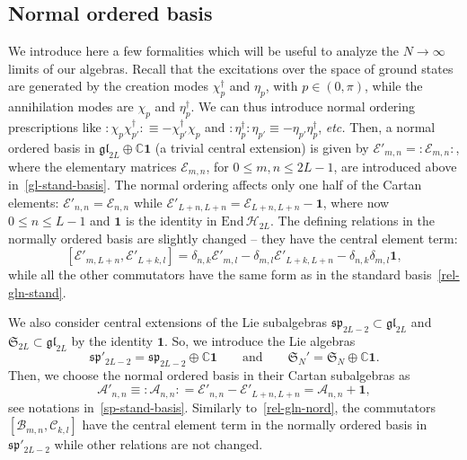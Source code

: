 \documentclass[11pt]{article}
\newcommand{\one}{\boldsymbol{1}}%
\newcommand{\Hilb}{\mathcal{H}}
\newcommand{\oC}{\mathbb{C}}
\newcommand{\Endo}{\mathrm{End}}
\newcommand{\interLie}{\mathfrak{S}}
\newcommand{\interfin}[1]{\interLie_{#1}}
\newcommand{\Asp}{\mathcal{A}}
\newcommand{\Bsp}{\mathcal{B}}
\newcommand{\Csp}{\mathcal{C}}
\newcommand{\Egl}{\mathcal{E}}
\newcommand{\gl}{\mathfrak{gl}}
\newcommand{\ssp}{\mathfrak{sp}}
\newcommand{\nord}[1]{\boldsymbol{\colon}\!\!{#1}\boldsymbol{\colon}\!\!}
\theoremstyle{definition}
\begin{document}
\subsection{Normal ordered basis}\label{sec:nord}
We introduce here a few  formalities which will be useful to analyze  the $N\to\infty$ limits of our algebras. Recall that the excitations over the  space of  ground states
are generated by  the
creation modes $\chi^{\dagger}_{p}$ and $\eta_p$, with $p\in(0,\pi)$, while the annihilation modes are  $\chi_{p}$ and $\eta^{\dagger}_p$. We can thus introduce normal ordering prescriptions like $\nord{\chi_{p}\chi^{\dagger}_{p'}}\equiv-\chi^{\dagger}_{p'}\chi_{p}$ and  $\nord{\eta^{\dagger}_{p}}\eta_{p'}\equiv-\eta_{p'}\eta^{\dagger}_{p}$, {\it etc.} Then, a normal ordered basis in $\gl_{2L}\oplus\oC\one$ (a trivial central extension) is given by $\Egl'_{m,n}=\nord{\Egl_{m,n}}$, where the elementary matrices $\Egl_{m,n}$, for $0\leq m,n\leq 2L-1$, are introduced above in~\eqref{gl-stand-basis}. The normal ordering affects only  one half of the Cartan elements: $\Egl'_{n,n} =  \Egl_{n,n}$ while $\Egl'_{L+n,L+n} =  \Egl_{L+n,L+n} - \one$, where now $0\leq n \leq L-1$ and $\one$ is the identity in $\Endo\, \Hilb_{2L}$.
The defining relations in the normally ordered basis are slightly changed -- they have the central element term:
\begin{equation}\label{rel-gln-nord}
[\Egl'_{m,L+n},\Egl'_{L+k,l}] = \delta_{n,k}\Egl'_{m,l} - \delta_{m,l}\Egl'_{L+k,L+n} - \delta_{n,k}\delta_{m,l}\one,
\end{equation}
while all the other commutators have the same form as in the standard basis~\eqref{rel-gln-stand}.

We also consider central extensions of the  Lie subalgebras $\ssp_{2L-2}\subset\gl_{2L}$ and $\interfin{2L}\subset\gl_{2L}$ by the identity $\one$. So, we introduce the Lie algebras \begin{equation}\label{def-prime-alg}
\ssp'_{2L-2}=\ssp_{2L-2}\oplus\oC\one\qquad \text{and}\qquad \interfin{N}'=\interfin{N}\oplus\oC\one.
\end{equation}
Then, we choose the normal ordered basis in their Cartan subalgebras as
\begin{equation}\label{sp-nord-basis}
\Asp'_{n,n} \equiv \nord{\Asp_{n,n}} = \Egl'_{n,n} - \Egl'_{L+n,L+n} =  \Asp_{n,n} + \one,
\end{equation}
 see notations in~\eqref{sp-stand-basis}.
 Similarly to~\eqref{rel-gln-nord}, the commutators $[\Bsp_{m,n},\Csp_{k,l}]$ have the central element term in the normally ordered basis in $\ssp'_{2L-2}$ while other relations are not changed.
\end{document}
